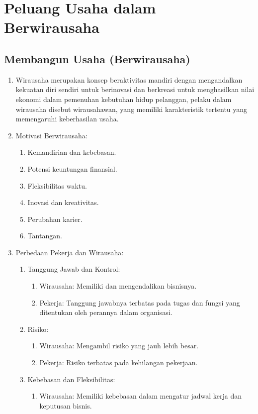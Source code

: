 \section{Peluang Usaha dalam Berwirausaha}
\subsection{Membangun Usaha (Berwirausaha)}
\begin{enumerate}
\item Wirausaha merupakan konsep beraktivitas mandiri dengan mengandalkan kekuatan diri sendiri untuk berinovasi dan berkreasi untuk menghasilkan nilai ekonomi dalam pemenuhan kebutuhan hidup pelanggan, pelaku dalam wirausaha disebut wirausahawan, yang memiliki karakteristik tertentu yang memengaruhi keberhasilan usaha.
\item Motivasi Berwirausaha:
  \begin{enumerate}
  \item Kemandirian dan kebebasan.
  \item Potensi keuntungan finansial.
  \item Fleksibilitas waktu.
  \item Inovasi dan kreativitas.
  \item Perubahan karier.
  \item Tantangan.
  \end{enumerate}
\item Perbedaan Pekerja dan Wirausaha:
  \begin{enumerate}
  \item Tanggung Jawab dan Kontrol:
    \begin{enumerate}
    \item Wirausaha: Memiliki dan mengendalikan bisnisnya.
    \item Pekerja: Tanggung jawabnya terbatas pada tugas dan fungsi yang ditentukan oleh perannya dalam organisasi.
    \end{enumerate}
  \item Risiko:
    \begin{enumerate}
    \item Wirausaha: Mengambil risiko yang jauh lebih besar.
    \item Pekerja: Risiko terbatas pada kehilangan pekerjaan.
    \end{enumerate}
  \item Kebebasan dan Fleksibilitas:
    \begin{enumerate}
    \item Wirausaha: Memiliki kebebasan dalam mengatur jadwal kerja dan keputusan bisnis.

\end{enumerate}
\end{enumerate}
\end{enumerate}
